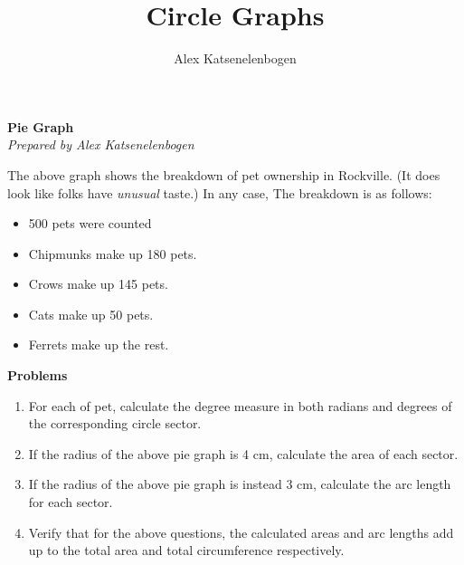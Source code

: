 \documentclass{article}
\title{Circle Graphs}
\author{Alex Katsenelenbogen}
\begin{document}
\begin{center}
      \Large\textbf{Pie Graph}\\
      \large\textit{Prepared by Alex Katsenelenbogen}
   \end{center}
   
   

\begin{center}
\end{center}

The above graph shows the breakdown of pet ownership in Rockville. (It does look like folks have \textit{unusual} taste.) 
In any case, The breakdown is as follows:
\begin{itemize}
\item 500 pets were counted
\item Chipmunks make up 180 pets.
\item Crows make up 145 pets.
\item Cats make up 50 pets. 
\item Ferrets make up the rest. 
\end{itemize}
\vspace{1cm}
\noindent
\textbf{\Large{Problems}}
\vspace{0.5cm}
\begin{enumerate}
\item 
For each of pet, calculate the degree measure in both radians and degrees
of the corresponding circle sector.
\item
If the radius of the above pie graph is 4 cm, calculate the area of each sector.
\item
If the radius of the above pie graph is instead 3 cm, calculate the arc length 
for each sector.
\item Verify that for the above questions, the calculated areas and arc lengths
add up to the total area and total circumference respectively.
\end{enumerate}
\end{document}
